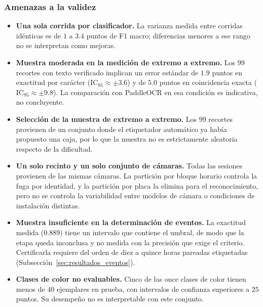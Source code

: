 \subsubsection{Amenazas a la validez}
\label{subsec:amenazas}

\begin{itemize}
    \item \textbf{Una sola corrida por clasificador.} La varianza medida entre
        corridas idénticas es de $1$ a $3{.}4$ puntos de F1 macro; diferencias
        menores a ese rango no se interpretan como mejoras.
    \item \textbf{Muestra moderada en la medición de extremo a extremo.} Los $99$
        recortes con texto verificado implican un error estándar de $1{.}9$ puntos
        en exactitud por carácter ($\mathrm{IC}_{95} \approx \pm 3{.}6$) y de
        $5{.}0$ puntos en coincidencia exacta ($\mathrm{IC}_{95} \approx \pm 9{.}8$).
        La comparación con PaddleOCR en esa condición es indicativa, no concluyente.
    \item \textbf{Selección de la muestra de extremo a extremo.} Los $99$ recortes
        provienen de un conjunto donde el etiquetador automático ya había
        propuesto una caja, por lo que la muestra no es estrictamente aleatoria
        respecto de la dificultad.
    \item \textbf{Un solo recinto y un solo conjunto de cámaras.} Todas las
        sesiones provienen de las mismas cámaras. La partición por bloque horario
        controla la fuga por identidad, y la partición por placa la elimina para el
        reconocimiento, pero no se controla la variabilidad entre modelos de
        cámara o condiciones de instalación distintas.
    \item \textbf{Muestra insuficiente en la determinación de eventos.} La
        exactitud medida ($0{.}889$) tiene un intervalo que contiene el umbral, de
        modo que la etapa queda inconclusa y no medida con la precisión que exige
        el criterio. Certificarla requiere del orden de diez a quince horas
        pareadas etiquetadas (Subsección~\ref{sec:resultados_eventos}).
    \item \textbf{Clases de color no evaluables.} Cinco de las once clases de color
        tienen menos de $40$ ejemplares en prueba, con intervalos de confianza
        superiores a $25$ puntos. Su desempeño no es interpretable con este
        conjunto.
\end{itemize}
